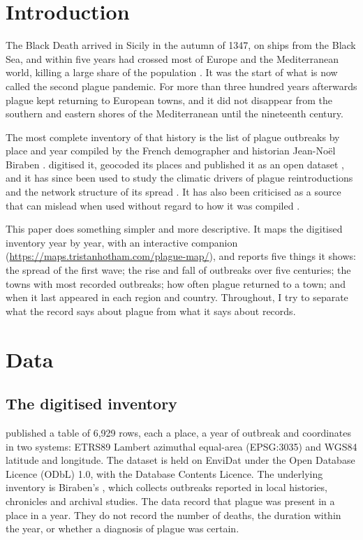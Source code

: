 \documentclass[11pt,a4paper]{article}
\begin{document}
\section{Introduction}
The Black Death arrived in Sicily in the autumn of 1347, on ships from the Black Sea, and within five years had crossed most of Europe and the Mediterranean world, killing a large share of the population \citep{benedictow2004}. It was the start of what is now called the second plague pandemic. For more than three hundred years afterwards plague kept returning to European towns, and it did not disappear from the southern and eastern shores of the Mediterranean until the nineteenth century.

The most complete inventory of that history is the list of plague outbreaks by place and year compiled by the French demographer and historian Jean-No\"el Biraben \citep{biraben1975}. \citet{buntgen2012} digitised it, geocoded its places and published it as an open dataset \citep{envidat}, and it has since been used to study the climatic drivers of plague reintroductions \citep{schmid2015} and the network structure of its spread \citep{gomez2017}. It has also been criticised as a source that can mislead when used without regard to how it was compiled \citep{roosen2018}.

This paper does something simpler and more descriptive. It maps the digitised inventory year by year, with an interactive companion (\url{https://maps.tristanhotham.com/plague-map/}), and reports five things it shows: the spread of the first wave; the rise and fall of outbreaks over five centuries; the towns with most recorded outbreaks; how often plague returned to a town; and when it last appeared in each region and country. Throughout, I try to separate what the record says about plague from what it says about records.

\section{Data}
\subsection{The digitised inventory}
\citet{buntgen2012} published a table of 6,929 rows, each a place, a year of outbreak and coordinates in two systems: ETRS89 Lambert azimuthal equal-area (EPSG:3035) and WGS84 latitude and longitude. The dataset is held on EnviDat \citep{envidat} under the Open Database Licence (ODbL) 1.0, with the Database Contents Licence. The underlying inventory is Biraben's \citep{biraben1975}, which collects outbreaks reported in local histories, chronicles and archival studies. The data record that plague was present in a place in a year. They do not record the number of deaths, the duration within the year, or whether a diagnosis of plague was certain.
\end{document}
